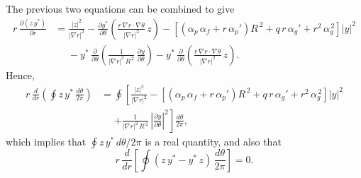 \documentclass[12pt,prb,aps,notitlepage]{revtex4-1}
\begin{document}
The previous two equations can be combined to give
\begin{align}
r\,\frac{\partial (z\,y^\ast)}{\partial r} &= \frac{|z|^2}{|\nabla r|^2} - \frac{\partial y^\ast}{\partial \theta}\left(\frac{r\,\nabla r\cdot\nabla\theta}{|\nabla r|^2}\,z\right)
 -\left[(\alpha_p\,\alpha_f+ r\,\alpha_p')R^{\,2} + q\,r\,\alpha_g'+r^2\,\alpha_g^{\,2}\right]|y|^2\nonumber\\[0.5ex]
 &\phantom{=} - y^\ast\,\frac{\partial}{\partial\theta}\!\left(\frac{1}{|\nabla r|^2\,R^{\,2}}\,\frac{\partial y}{\partial\theta}\right)-y^\ast\,\frac{\partial}{\partial\theta}\!\left(\frac{r\,\nabla r\cdot\nabla\theta}{|\nabla r|^2}\,z\right).
\end{align}
Hence,
\begin{align}
r\,\frac{d}{dr}\!\left(\oint z\,y^\ast\,\frac{d\theta}{2\pi}\right)&= \oint\left[\frac{|z|^2}{|\nabla r|^2}- \left[(\alpha_p\,\alpha_f+ r\,\alpha_p')R^{\,2} + q\,r\,\alpha_g'+r^2\,\alpha_g^{\,2}\right]|y|^2\right.\nonumber\\[0.5ex]
&\phantom{=}\left.
+ \frac{1}{|\nabla r|^2\,R^{\,2}}\,\left|\frac{\partial y}{\partial \theta}\right|^2\right]\frac{d\theta}{2\pi},
\end{align}
which implies that $\oint z\,y^\ast\,d\theta/2\pi$ is a real quantity, and also that
\begin{equation}
r\,\frac{d}{dr}\!\left[\oint(z\,y^\ast-y^\ast\,z)\,\frac{d\theta}{2\pi}\right] =0. 
\end{equation}
\end{document}
